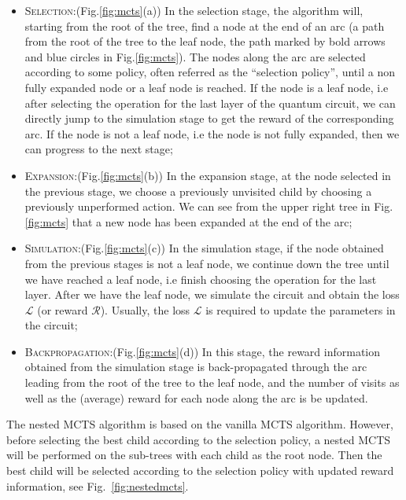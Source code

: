 \documentclass{ieeeaccess}
\begin{document}
  \begin{itemize}
      \item \textsc{Selection:}(Fig.\ref{fig:mcts}(a)) In the selection stage, the algorithm will, starting from the root of the tree, find a node at the end of an arc (a path from the root of the tree to the leaf node, the path marked by bold arrows and blue circles in Fig.\ref{fig:mcts}). The nodes along the arc are selected according to some policy, often referred as the ``selection policy'', until a non fully expanded node or a leaf node is reached. If the node is a leaf node, i.e after selecting the operation for the last layer of the quantum circuit, we can directly jump to the simulation stage to get the reward of the corresponding arc. If the node is not a leaf node, i.e the node is not fully expanded, then we can progress to the next stage;
      \item \textsc{Expansion:}(Fig.\ref{fig:mcts}(b)) In the expansion stage, at the node selected in the previous stage, we choose a previously unvisited child by choosing a previously unperformed action. We can see from the upper right tree in Fig.\ref{fig:mcts} that a new node has been expanded at the end of the arc; %
      \item \textsc{Simulation:}(Fig.\ref{fig:mcts}(c)) In the simulation stage, if the node obtained from the previous stages is not a leaf node, we continue down the tree until we have reached a leaf node, i.e finish choosing the operation for the last layer. After we have the leaf node, we simulate the circuit and obtain the loss $\mathcal{L}$ (or reward $\mathcal{R}$). Usually, the loss $\mathcal{L}$ is required to update the parameters in the circuit;
      \item \textsc{Backpropagation:}(Fig.\ref{fig:mcts}(d)) In this stage, the reward information obtained from the simulation stage is back-propagated through the arc leading from the root of the tree to the leaf node, and the number of visits as well as the (average) reward for each node along the arc is be updated.
  \end{itemize}
  
  The nested MCTS algorithm \cite{nestedmontecarlosearch} is based on the vanilla MCTS algorithm. However, before selecting the best child according to the selection policy, a nested MCTS will be performed on the sub-trees with each child as the root node. Then the best child will be selected according to the selection policy with updated reward information, see Fig.~\ref{fig:nestedmcts}.
  
\end{document}

